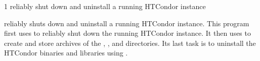 \begin{ManPage}{\label{man-condor-cold-stop}}{1}
{reliably shut down and uninstall a running HTCondor instance}


\Synopsis {}


\Description 
{} reliably shuts down and uninstall a
running HTCondor instance.  
This program first uses  to
reliably shut down the running HTCondor instance.
It then uses  to create and store archives of the
, , and  directories.
Its last task is to 
uninstall the HTCondor binaries and libraries using .


\end{ManPage}
